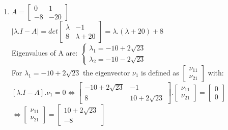 \documentclass[14pt,a4paper]{article}
\begin{document}
\begin{enumerate}
	\doublespacing
	\item 
		$A = \begin{bmatrix} 0&1 \\ -8&-20 \end{bmatrix} $ \\
		$|\lambda .I - A| = det\begin{bmatrix} \lambda & -1 \\ 8 & \lambda + 20 \end{bmatrix} = \lambda .(\lambda +20) +8 $ \\
		Eigenvalues of A are: 
			$\begin{cases} \lambda_1 = -10 + 2\sqrt{23}  \\ \lambda_2 = -10 - 2\sqrt{23} \end{cases} $ \\
		For $\lambda_1 = -10 + 2\sqrt{23}$ the eigenvector $\nu_1$ is defined as $\begin{bmatrix}\nu_{11}\\ \nu_{21} \end{bmatrix}$ with: \\
			$[\lambda .I - A].\nu_1 = 0 \Leftrightarrow \begin{bmatrix} -10 + 2\sqrt{23} & -1 \\ 8& 10+2\sqrt{23} \end{bmatrix} .\begin{bmatrix}\nu_{11}\\ \nu_{21} \end{bmatrix} = \begin{bmatrix} 0\\0 \end{bmatrix} $ \\
			$ \Leftrightarrow \begin{bmatrix} \nu_{11} \\\nu_{21}	\end{bmatrix} = \begin{bmatrix} 10+2\sqrt{23} \\-8	\end{bmatrix}$ \\
	

\end{enumerate}
\end{document}
